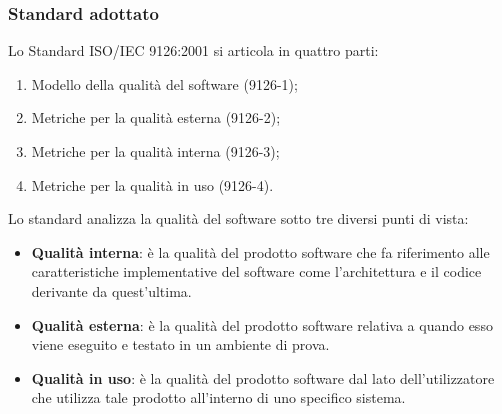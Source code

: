 		\subsubsection{Standard adottato}
		Lo Standard ISO/IEC 9126:2001 si articola in quattro parti:
		\begin{enumerate}
		\item Modello della qualità del software (9126-1);
			\item Metriche per la qualità esterna (9126-2);
			\item Metriche per la qualità interna (9126-3);
			\item Metriche per la qualità in uso (9126-4).
		\end{enumerate}
		Lo standard analizza la qualità del software sotto tre diversi punti di vista:
		\begin{itemize}
			\item \textbf{Qualità interna}: è la qualità del prodotto software che fa riferimento alle caratteristiche implementative del software come l'architettura e il codice derivante da quest'ultima.
			\item \textbf{Qualità esterna}: è la qualità del prodotto software relativa a quando esso viene eseguito e testato in un ambiente di prova. 
			\item \textbf{Qualità in uso}: è la qualità del prodotto software dal lato dell'utilizzatore che utilizza tale prodotto all'interno di uno specifico sistema.
		\end{itemize}
